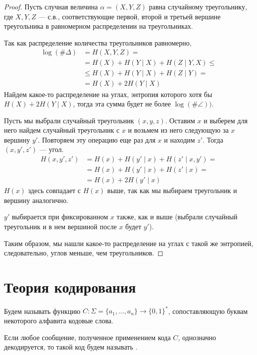 \begin{proof}
 	Пусть случная величина $ \alpha = (X, Y, Z)$ равна случайному треугольнику, где $ X, Y, Z$ --- с.в., соответствующие первой, второй и третьей вершине треугольника в равномерном распределении на треугольниках. 

	Так как распределение количества треугольников равномерно,
	\begin{align*}
		\log (\# \Delta)& = H(X, Y, Z)  = \\
					  &= H(X) + H(Y \mid  X) + H(Z \mid  Y, X) \le \tag{Chain rule}  \\
					  & \le  H(X) + H(Y \mid X) + H(Z \mid Y) = \tag{циклический сдвиг в треугольнике} \\
		 & = H(X) + 2 H(Y \mid X)
	\end{align*}
Найдем какое-то распределение на углах, энтропия которого хотя бы $ H(X) + 2H(Y \mid X)$, тогда эта сумма будет не более  $  \log (\# \angle)) $.

	Пусть мы выбрали случайный треугольник $ (x, y, z)$. Оставим $ x$ и выберем для него найдем случайный треугольник с $ x$ и возьмем из него следующую за $ x$ вершину $ y'$. Повторяем эту операцию еще раз для $ x$ и находим  $ z'$. Тогда $ (x,  y', z')$ --- угол.
	\begin{align*}
		H(x, y', z') & = H(x) + H(y' \mid x) + H(z' \mid x, y') = \tag{Так как $ y'$ и  $ z'$ независимы при выбранном  $ x$}  \\
					 & =H(x) + H(y'\mid x) + H(z' \mid x) = \tag{Выбор аналогичный} \\
					 & = H(x) + 2 H(y' \mid x)
	\end{align*}
	$ H(x)$ здесь совпадает с  $ H(x) $ выше, так как мы выбираем треугольник и вершину аналогично.

	$ y'$ выбирается при фиксированном  $ x$ также, как и выше (выбрали случайный треугольник и в нем вершиной после $ x$ будет  $ y'$).

	Таким образом, мы нашли какое-то распределение на углах с такой же энтропией, следовательно, углов меньше, чем треугольников.
\end{proof}



\chapter{Теория кодирования}
\begin{defn}[Код]
	Будем называть  функцию $ C \colon \Sigma = \{a_1, \ldots , a_n\} \to \{0, 1\}^{*}$, сопоставляющую буквам некоторого алфавита кодовые слова.

	Если любое сообщение, полученное применением кода $ C$, однозначно декодируется, то такой код будем называть .
\end{defn}

